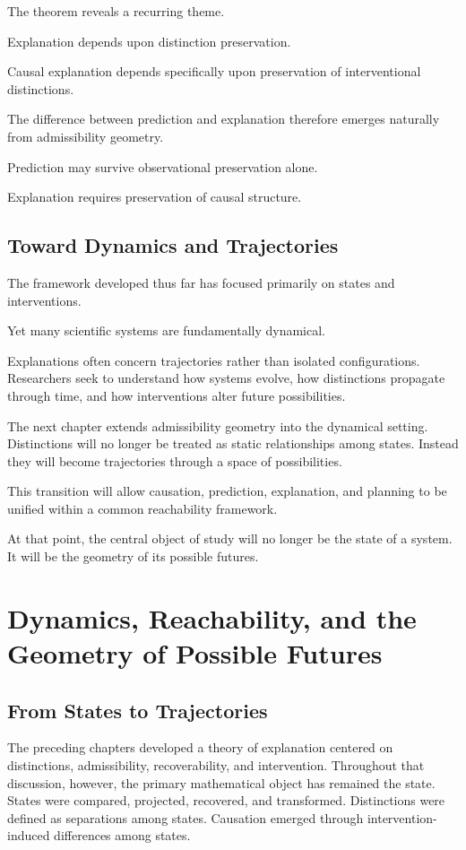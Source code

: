 \documentclass[11pt,oneside,openany]{book}
\begin{document}
The theorem reveals a recurring theme.

Explanation depends upon distinction preservation.

Causal explanation depends specifically upon preservation of interventional distinctions.

The difference between prediction and explanation therefore emerges naturally from admissibility geometry.

Prediction may survive observational preservation alone.

Explanation requires preservation of causal structure.

\section{Toward Dynamics and Trajectories}

The framework developed thus far has focused primarily on states and interventions.

Yet many scientific systems are fundamentally dynamical.

Explanations often concern trajectories rather than isolated configurations. Researchers seek to understand how systems evolve, how distinctions propagate through time, and how interventions alter future possibilities.

The next chapter extends admissibility geometry into the dynamical setting. Distinctions will no longer be treated as static relationships among states. Instead they will become trajectories through a space of possibilities.

This transition will allow causation, prediction, explanation, and planning to be unified within a common reachability framework.

At that point, the central object of study will no longer be the state of a system. It will be the geometry of its possible futures.

\chapter{Dynamics, Reachability, and the Geometry of Possible Futures}

\section{From States to Trajectories}

The preceding chapters developed a theory of explanation centered on distinctions, admissibility, recoverability, and intervention. Throughout that discussion, however, the primary mathematical object has remained the state. States were compared, projected, recovered, and transformed. Distinctions were defined as separations among states. Causation emerged through intervention-induced differences among states.
\end{document}
